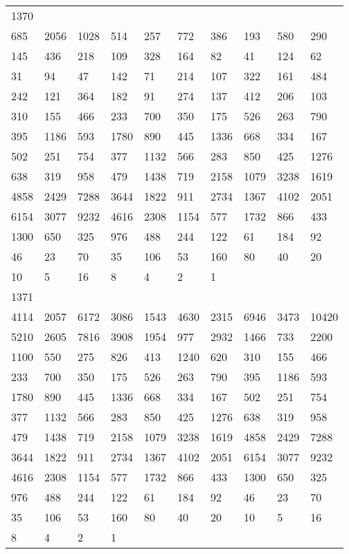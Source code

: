 \begin{longtable}{*{10}{l}}
1370&&&&&&&&&\\
685& 2056& 1028& 514& 257& 772& 386& 193& 580& 290\\
145& 436& 218& 109& 328& 164& 82& 41& 124& 62\\
31& 94& 47& 142& 71& 214& 107& 322& 161& 484\\
242& 121& 364& 182& 91& 274& 137& 412& 206& 103\\
310& 155& 466& 233& 700& 350& 175& 526& 263& 790\\
395& 1186& 593& 1780& 890& 445& 1336& 668& 334& 167\\
502& 251& 754& 377& 1132& 566& 283& 850& 425& 1276\\
638& 319& 958& 479& 1438& 719& 2158& 1079& 3238& 1619\\
4858& 2429& 7288& 3644& 1822& 911& 2734& 1367& 4102& 2051\\
6154& 3077& 9232& 4616& 2308& 1154& 577& 1732& 866& 433\\
1300& 650& 325& 976& 488& 244& 122& 61& 184& 92\\
46& 23& 70& 35& 106& 53& 160& 80& 40& 20\\
10& 5& 16& 8& 4& 2& 1& \\

1371&&&&&&&&&\\
4114& 2057& 6172& 3086& 1543& 4630& 2315& 6946& 3473& 10420\\
5210& 2605& 7816& 3908& 1954& 977& 2932& 1466& 733& 2200\\
1100& 550& 275& 826& 413& 1240& 620& 310& 155& 466\\
233& 700& 350& 175& 526& 263& 790& 395& 1186& 593\\
1780& 890& 445& 1336& 668& 334& 167& 502& 251& 754\\
377& 1132& 566& 283& 850& 425& 1276& 638& 319& 958\\
479& 1438& 719& 2158& 1079& 3238& 1619& 4858& 2429& 7288\\
3644& 1822& 911& 2734& 1367& 4102& 2051& 6154& 3077& 9232\\
4616& 2308& 1154& 577& 1732& 866& 433& 1300& 650& 325\\
976& 488& 244& 122& 61& 184& 92& 46& 23& 70\\
35& 106& 53& 160& 80& 40& 20& 10& 5& 16\\
8& 4& 2& 1& \\


\end{longtable}
